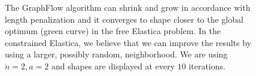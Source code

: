 \begin{figure}

\caption{The GraphFlow algorithm can shrink and grow in accordance with length penalization and it converges to shape closer to the global optimum (green curve) in the free Elastica problem. In the constrained Elastica, we believe that we can improve the results by using a larger, possibly random, neighborhood. We are using $n=2,a=2$ and shapes are displayed at every $10$ iterations.}
\label{ch8:fig:graph-flow-neigh2-results}
\end{figure}

